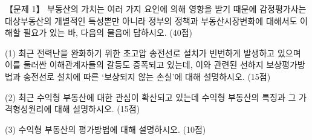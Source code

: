 \begin{longquestion}{【문제 1】}
부동산의 가치는 여러 가지 요인에 의해 영향을 받기 때문에 감정평가사는 대상부동산의 개별적인 특성뿐만 아니라 정부의 정책과 부동산시장변화에 대해서도 이해할 필요가 있는 바, 다음의 물음에 답하시오. (40점) \par
\medskip\noindent (1) 최근 전력난을 완화하기 위한 초고압 송전선로 설치가 빈번하게 발생하고 있으며 이를 둘러싼 이해관계자들의 갈등도 증폭되고 있는데, 이와 관련된 선하지 보상평가방법과 송전선로 설치에 따른 ‘보상되지 않는 손실’에 대해 설명하시오. (15점) \par
\medskip\noindent (2) 최근 수익형 부동산에 대한 관심이 확산되고 있는데 수익형 부동산의 특징과 그 가격형성원리에 대해 설명하시오. (15점) \par
\medskip\noindent (3) 수익형 부동산의 평가방법에 대해 설명하시오. (10점) \par
\end{longquestion}

